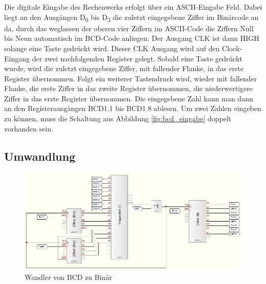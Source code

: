 \documentclass[a4paper,12pt,fleqn,oneside]{article}
\begin{document}
		\noindent
		Die digitale Eingabe des Rechenwerks erfolgt über ein ASCII-Eingabe Feld. Dabei liegt an den Ausgängen D\textsubscript{0} 
		bis D\textsubscript{3} die zuletzt eingegebene Ziffer im Binärcode an da, durch das weglassen der oberen vier Ziffern im 
		ASCII-Code die Ziffern Null bis Neun automatisch im BCD-Code anliegen. Der Ausgang CLK ist dann HIGH solange eine Taste 
		gedrückt wird. Dieser CLK Ausgang wird auf den Clock-Eingang der zwei nachfolgenden Register gelegt. Sobald eine Taste 
		gedrückt wurde, wird die zuletzt eingegebene Ziffer, mit fallender Flanke, in das erste Register übernommen. Folgt ein 
		weiterer Tastendruck wird, wieder mit fallender Flanke, die erste Ziffer in das zweite Register übernommen, die 
		niederwertigere Ziffer in das erste Register übernommen. Die eingegebene Zahl kann man dann an den Registerausgängen 
		BCD1.1 bis BCD1.8 ablesen. Um zwei Zahlen eingeben zu können, muss die Schaltung aus Abbildung \ref{fig:bcd_eingabe} 
		doppelt vorhanden sein.


	

\newpage
	\subsection{Umwandlung}
		\begin{figure}[h]
			\center
			\includegraphics[width=1.0\textwidth]{wandler_dezimal_binaer}
			\caption{Wandler von BCD zu Binär}
			\label{fig:wandler_dezimal_binaer}
		\end{figure}



\newpage
\end{document}
